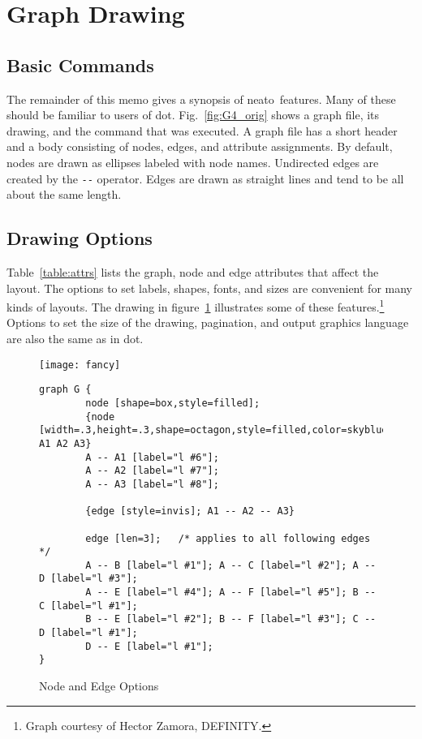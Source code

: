 \documentclass[11pt]{article}
\def\dot{{\sc dot}}
\def\neato{{\sc neato}}
\begin{document}
\section{Graph Drawing}
\subsection{Basic Commands}
The remainder of this memo gives a synopsis of \neato\ features.
Many of these should be familiar to users of \dot.
Fig.~\ref{fig:G4_orig} shows a graph file, its drawing,
and the command that was executed. A graph file has a
short header and a body consisting of nodes, edges, and
attribute assignments.
By default, nodes are drawn as ellipses labeled with node names.
Undirected edges are created by the \verb"--" operator.
Edges are drawn as straight lines and tend to be all about the same length.

\subsection{Drawing Options}
Table~\ref{table:attrs} lists the graph, node and edge
attributes that affect the layout.
The options to set labels, shapes, fonts, and sizes are convenient
for many kinds of layouts.  The drawing in figure~\ref{fig:fancy}
illustrates some of these features.\footnote{Graph courtesy of
Hector Zamora, DEFINITY.}
Options to set the size of the drawing, pagination, and output graphics
language are also the same as in \dot.

\begin{figure}
	\centerline{\texttt{[image: fancy]}}	 %
\footnotesize
\begin{verbatim}
graph G {
        node [shape=box,style=filled];
        {node [width=.3,height=.3,shape=octagon,style=filled,color=skyblue] A1 A2 A3}
        A -- A1 [label="l #6"];
        A -- A2 [label="l #7"];
        A -- A3 [label="l #8"];

        {edge [style=invis]; A1 -- A2 -- A3}

        edge [len=3];   /* applies to all following edges */
        A -- B [label="l #1"]; A -- C [label="l #2"]; A -- D [label="l #3"];
        A -- E [label="l #4"]; A -- F [label="l #5"]; B -- C [label="l #1"];
        B -- E [label="l #2"]; B -- F [label="l #3"]; C -- D [label="l #1"];
        D -- E [label="l #1"];
}
\end{verbatim}
    \caption{Node and Edge Options}
    \label{fig:fancy}
\end{figure}
\end{document}
